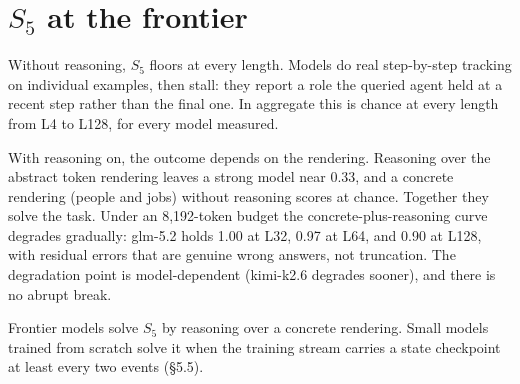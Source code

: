\documentclass[11pt]{article}
\newcommand{\Sfive}{$S_5$}
\begin{document}
\appendix

\section{\Sfive{} at the frontier}
\label{app:s5}

Without reasoning, \Sfive{} floors at every length. Models do real step-by-step tracking on
individual examples, then stall: they report a role the queried agent held at a recent step
rather than the final one. In aggregate this is chance at every length from L4 to L128, for
every model measured.

With reasoning on, the outcome depends on the rendering. Reasoning over the abstract token rendering leaves a strong model near 0.33, and a concrete rendering (people and jobs) without reasoning scores at chance. Together they solve the task. Under an 8{,}192-token budget the concrete-plus-reasoning
curve degrades gradually: glm-5.2 holds 1.00 at L32, 0.97 at L64, and 0.90 at L128, with
residual errors that are genuine wrong answers, not truncation. The degradation point is
model-dependent (kimi-k2.6 degrades sooner), and there is no abrupt break.

Frontier models solve \Sfive{} by reasoning over a concrete rendering. Small models trained
from scratch solve it when the training stream carries a state checkpoint at least every two
events (\S5.5).
\end{document}
